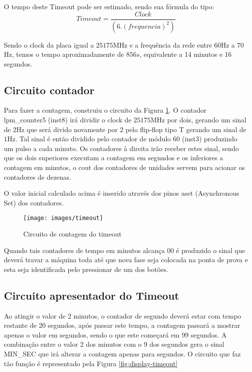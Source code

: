 O tempo deste Timeout pode ser estimado, sendo sua fórmula do tipo: $$Timeout = \frac{Clock}{\left(\left. 6 \right. . \left. \left(frequencia\right)^2\right.\right)}$$

Sendo o clock da placa igual a $25175$MHz e a frequência da rede entre $60$Hz a $70$Hz, temos o tempo aproximadamente de $856s$, equivalente a 14 minutos e 16 segundos.

\subsection{Circuito contador}

Para fazer a contagem, construiu o circuito da Figura \ref{fig:timeout}.
O contador lpm\_counter5 (inst8) irá dividir o clock de $25175$MHz por dois, gerando um sinal de $2$Hz que será divido novamente por 2 pelo flip-flop tipo T gerando um sinal de $1$Hz. Tal sinal é então dividido pelo contador de módulo 60 (inst3) produzindo um pulso a cada minuto. Os contadores à direita irão receber estes sinal, sendo que os dois superiores executam a contagem em segundos e os inferiores a contagem em minutos, o cout dos contadores de unidades servem para acionar os contadores de dezenas.

O valor inicial calculado acima é inserido através dos pinos aset (Asynchronous Set) dos contadores.

\begin{figure}[!htp]
	\centering
	\caption{Circuito de contagem do timeout}
	\texttt{[image: images/timeout]}
	\label{fig:timeout}
\end{figure}

Quando tais contadores de tempo em minutos alcança 00 é produzido o sinal que deverá travar a máquina toda até que nova fase seja colocada na ponta de prova e esta seja identificada pelo pressionar de um dos botões.

\subsection{Circuito apresentador do Timeout}

Ao atingir o valor de 2 minutos, o contador de segundo deverá estar com tempo restante de 20 segundos, após passar este tempo, a contagem passará a mostrar apenas o valor em segundos, sendo o que este começará em 99 segundos. A combinação entre o valor 2 dos minutos com o 9 dos segundos gera o sinal MIN\_SEC que irá alterar a contagem apenas para segundos. O circuito que faz tão função é representado pela Figura \ref{fig:display-timeout}

